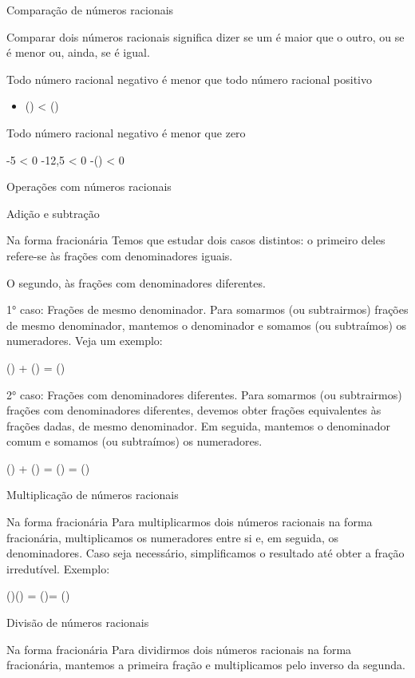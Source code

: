 Comparação de números racionais

Comparar dois números racionais significa dizer se um é maior que o
outro, ou se é menor ou, ainda, se é igual.

Todo número racional negativo é menor que todo número racional positivo

\begin{itemize}
\tightlist

\item 
  () \textless{} ()
\end{itemize}

Todo número racional negativo é menor que zero

-5 \textless{} 0 -12,5 \textless{} 0 -() \textless{} 0

Operações com números racionais

Adição e subtração

Na forma fracionária Temos que estudar dois casos distintos: o primeiro
deles refere-se às frações com denominadores iguais.

O segundo, às frações com denominadores diferentes.

1° caso: Frações de mesmo denominador. Para somarmos (ou subtrairmos)
frações de mesmo denominador, mantemos o denominador e somamos (ou
subtraímos) os numeradores. Veja um exemplo:

() + () = ()

2° caso: Frações com denominadores diferentes. Para somarmos (ou
subtrairmos) frações com denominadores diferentes, devemos obter frações
equivalentes às frações dadas, de mesmo denominador. Em seguida,
mantemos o denominador comum e somamos (ou subtraímos) os numeradores.

() + () = () =
()

Multiplicação de números racionais

Na forma fracionária Para multiplicarmos dois números racionais na forma
fracionária, multiplicamos os numeradores entre si e, em seguida, os
denominadores. Caso seja necessário, simplificamos o resultado até obter
a fração irredutível. Exemplo:

()\times () = ()= ()

Divisão de números racionais

Na forma fracionária Para dividirmos dois números racionais na forma
fracionária, mantemos a primeira fração e multiplicamos pelo inverso da
segunda.

